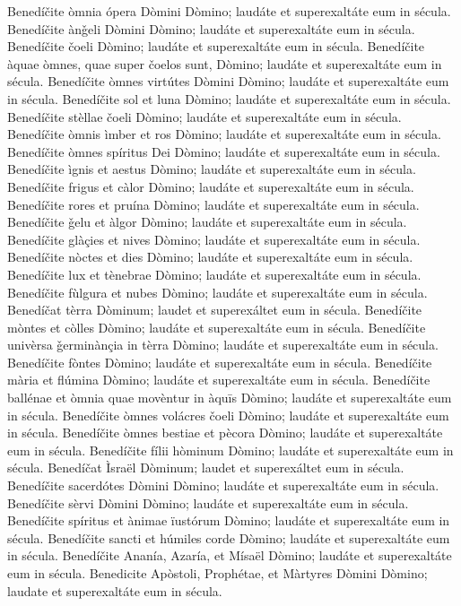 Benedíčite òmnia ópera Dòmini Dòmino; laudáte et superexaltáte eum in sécula.
Benedíčite ànǧeli Dòmini Dòmino; laudáte et superexaltáte eum in sécula.
Benedíčite čoeli Dòmino; laudáte et superexaltáte eum in sécula.
Benedíčite àquae òmnes, quae super čoelos sunt, Dòmino; laudáte et superexaltáte eum in sécula.
Benedíčite òmnes virtútes Dòmini Dòmino; laudáte et superexaltáte eum in sécula.
Benedíčite sol et luna Dòmino; laudáte et superexaltáte eum in sécula.
Benedíčite stèllae čoeli Dòmino; laudáte et superexaltáte eum in sécula.
Benedíčite òmnis ìmber et ros Dòmino; laudáte et superexaltáte eum in sécula.
Benedíčite òmnes spíritus Dei Dòmino; laudáte et superexaltáte eum in sécula.
Benedíčite ìgnis et aestus Dòmino; laudáte et superexaltáte eum in sécula.
Benedíčite frigus et càlor Dòmino; laudáte et superexaltáte eum in sécula.
Benedíčite rores et pruína Dòmino; laudáte et superexaltáte eum in sécula.
Benedíčite ǧelu et àlgor Dòmino; laudáte et superexaltáte eum in sécula.
Benedíčite glàçies et nives Dòmino; laudáte et superexaltáte eum in sécula.
Benedíčite nòctes et dies Dòmino; laudáte et superexaltáte eum in sécula.
Benedíčite lux et tènebrae Dòmino; laudáte et superexaltáte eum in sécula.
Benedíčite fùlgura et nubes Dòmino; laudáte et superexaltáte eum in sécula.
Benedíčat tèrra Dòminum; laudet et superexáltet eum in sécula.
Benedíčite mòntes et còlles Dòmino; laudáte et superexaltáte eum in sécula.
Benedíčite univèrsa ǧerminànçia in tèrra Dòmino; laudáte et superexaltáte eum in sécula.
Benedíčite fòntes Dòmino; laudáte et superexaltáte eum in sécula.
Benedíčite mària et flúmina Dòmino; laudáte et superexaltáte eum in sécula.
Benedíčite ballénae et òmnia quae movèntur in àquīs Dòmino; laudáte et superexaltáte eum in sécula.
Benedíčite òmnes volácres čoeli Dòmino; laudáte et superexaltáte eum in sécula.
Benedíčite òmnes bestiae et pècora Dòmino; laudáte et superexaltáte eum in sécula.
Benedíčite fílii hòminum Dòmino; laudáte et superexaltáte eum in sécula.
Benedíčat Ìsraël Dòminum; laudet et superexáltet eum in sécula.
Benedíčite sacerdótes Dòmini Dòmino; laudáte et superexaltáte eum in sécula.
Benedíčite sèrvi Dòmini Dòmino; laudáte et superexaltáte eum in sécula.
Benedíčite spíritus et ànimae ïustórum Dòmino; laudáte et superexaltáte eum in sécula.
Benedíčite sancti et húmiles corde Dòmino; laudáte et superexaltáte eum in sécula.
Benedíčite Ananía, Azaría, et Mísaël Dòmino; laudáte et superexaltáte eum in sécula.
Benedicite Apòstoli, Prophétae, et Màrtyres Dòmini Dòmino; laudate et superexaltáte eum in sécula.
